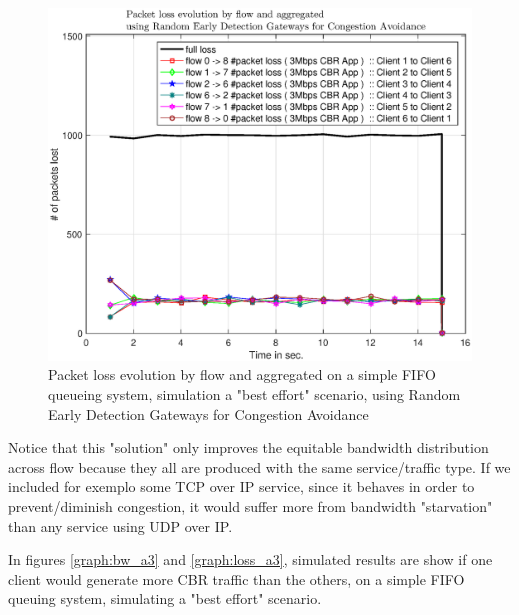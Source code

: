 \documentclass[conference,compsoc]{IEEEtran}
\begin{document}
     \begin{figure}[H]
     \centering
     \includegraphics[width=1\columnwidth]{EPS/A/loss_a2_red.eps}
     \caption{Packet loss evolution by flow and aggregated on a simple FIFO queueing system, simulation a "best effort" scenario, using Random Early Detection Gateways for Congestion Avoidance}\label{graph:loss_a2_red}
     \end{figure}

     Notice that this "solution" only improves the equitable bandwidth distribution across flow because they all are produced with the same service/traffic type. If we included for exemplo some TCP over IP service, since it behaves in order to prevent/diminish congestion, it would suffer more from  bandwidth "starvation" than any service using UDP over IP. \par
     In figures   \ref{graph:bw_a3} and \ref{graph:loss_a3}, simulated results are show if one client would generate more CBR traffic than
     the others, on a simple FIFO queuing system, simulating a "best effort" scenario.
\end{document}
